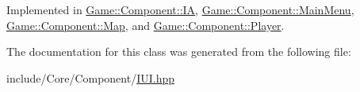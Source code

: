 Implemented in \mbox{\hyperlink{class_game_1_1_component_1_1_i_a_a50991daa660054341c1f339611226c02}{Game\+::\+Component\+::\+IA}}, \mbox{\hyperlink{class_game_1_1_component_1_1_main_menu_a36f876bbeca9056e17c6d13b82fc3364}{Game\+::\+Component\+::\+Main\+Menu}}, \mbox{\hyperlink{class_game_1_1_component_1_1_map_af062dd2c3e677c1d3d9204cac8508dde}{Game\+::\+Component\+::\+Map}}, and \mbox{\hyperlink{class_game_1_1_component_1_1_player_a5d5f837406a8e9f62dbe2c83ab3751b6}{Game\+::\+Component\+::\+Player}}.



The documentation for this class was generated from the following file\+:\begin{DoxyCompactItemize}
\item 
include/\+Core/\+Component/\mbox{\hyperlink{_i_u_i_8hpp}{I\+U\+I.\+hpp}}\end{DoxyCompactItemize}
